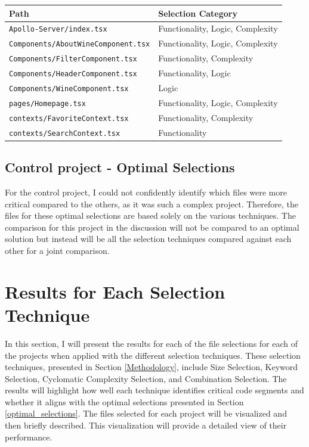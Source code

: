 \noindent
\begin{center}
\begin{tabularx}{\textwidth}{>{\hsize=1.1\hsize}X >{\hsize=0.9\hsize}X}
    \toprule
    \textbf{Path} & \textbf{Selection Category} \\
    \midrule
    \texttt{Apollo-Server/index.tsx} & Functionality,  Logic, Complexity \\
    \texttt{Components/AboutWineComponent.tsx} & Functionality,  Logic, Complexity \\
    \texttt{Components/FilterComponent.tsx} & Functionality, Complexity \\
    \texttt{Components/HeaderComponent.tsx} & Functionality, Logic \\
    \texttt{Components/WineComponent.tsx} & Logic \\
    \texttt{pages/Homepage.tsx} & Functionality,  Logic, Complexity \\
    \texttt{contexts/FavoriteContext.tsx} & Functionality, Complexity \\
    \texttt{contexts/SearchContext.tsx} & Functionality \\
    \bottomrule
\end{tabularx}
\end{center}


\subsection{Control project - Optimal Selections}
For the control project, I could not confidently identify which files were more critical compared to the others, as it was such a complex project. Therefore, the files for these optimal selections are based solely on the various techniques. The comparison for this project in the discussion will not be compared to an optimal solution but instead will be all the selection techniques compared against each other for a joint comparison.\\




\section{Results for Each Selection Technique}
In this section, I will present the results for each of the file selections for each of the projects when applied with the different selection techniques. These selection techniques, presented in Section \ref{Methodology}, include Size Selection, Keyword Selection, Cyclomatic Complexity Selection, and Combination Selection. The results will highlight how well each technique identifies critical code segments and whether it aligns with the optimal selections presented in Section \ref{optimal_selections}. The files selected for each project will be visualized and then briefly described. This visualization will provide a detailed view of their performance. \\

